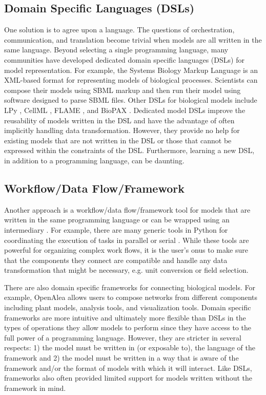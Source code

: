 \documentclass[journal]{IEEEtran}
\begin{document}
\subsection{Domain Specific Languages (DSLs)}\label{SS:dsl}
%
One solution is to agree upon a language. The questions of orchestration, communication, and translation become trivial when models are all written in the same language. Beyond selecting a single programming language, many communities have  developed dedicated domain specific languages (DSLs) for model representation. For example, the Systems Biology Markup Language \citep[SBML][]{Hucka2003} is an XML-based format for representing models of biological processes. Scientists can compose their models using SBML markup and then run their model using software designed to parse SBML files. Other DSLs for biological models include LPy \citep{Boudon2012}, CellML \citep{Cuellar2003}, FLAME \citep{Coakley2012}, and BioPAX \citep{Demir2010}. Dedicated model DSLs improve the reusability of models written in the DSL and have the advantage of often implicitly handling data transformation. However, they provide no help for existing models that are not written in the DSL or those that cannot be expressed within the constraints of the DSL. Furthermore, learning a new DSL, in addition to a programming language, can be daunting.

\subsection{Workflow/Data Flow/Framework}\label{SS:framework}
%
Another approach is a workflow/data flow/framework tool for models that are written in the same programming language or can be wrapped using an intermediary \citep[e.g. Cython, ][]{Behnel2011a}. For example, there are many generic tools in Python for coordinating the execution of tasks in parallel or serial \citep[e.g.][]{babuji18, celery, luigi}. While these tools are powerful for organizing complex work flows, it is the user's onus to make sure that the components they connect are compatible and handle any data transformation that might be necessary, e.g. unit conversion or field selection.

There are also domain specific frameworks for connecting biological models. For example, OpenAlea \citep{Pradal2015} allows users to compose networks from different components including plant models, analysis tools, and visualization tools. Domain specific frameworks are more intuitive and ultimately more flexible than DSLs in the types of operations they allow models to perform since they have access to the full power of a programming language. However, they are stricter in several respects: 1) the model must be written in (or exposable to), the language of the framework and 2) the model must be written in a way that is aware of the framework and/or the format of models with which it will interact. Like DSLs, frameworks also often provided limited support for models written without the framework in mind. 
\end{document}
